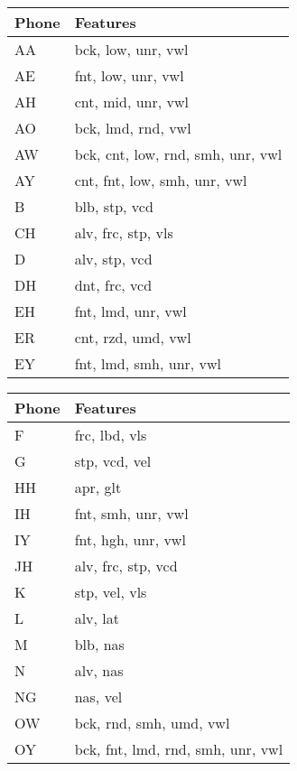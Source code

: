 \begin{table}[!htb]
    \tiny
    \begin{minipage}{.33\linewidth}
        \centering
        \begin{tabular}{ll}
            Phone & Features \\
            \hline
            AA & bck, low, unr, vwl \\
            AE & fnt, low, unr, vwl \\
            AH & cnt, mid, unr, vwl \\
            AO & bck, lmd, rnd, vwl \\
            AW & bck, cnt, low, rnd, smh, unr, vwl \\
            AY & cnt, fnt, low, smh, unr, vwl \\
            B & blb, stp, vcd \\
            CH & alv, frc, stp, vls \\
            D & alv, stp, vcd \\
            DH & dnt, frc, vcd \\
            EH & fnt, lmd, unr, vwl \\
            ER & cnt, rzd, umd, vwl \\
            EY & fnt, lmd, smh, unr, vwl
        \end{tabular}
    \end{minipage}%
    \begin{minipage}{.33\linewidth}
        \centering
        \begin{tabular}{ll}
            Phone & Features \\
            \hline
            F &  frc, lbd, vls \\
            G &  stp, vcd, vel \\
            HH & apr, glt \\
            IH & fnt, smh, unr, vwl \\
            IY & fnt, hgh, unr, vwl \\
            JH & alv, frc, stp, vcd \\
            K &  stp, vel, vls \\
            L &  alv, lat \\
            M &  blb, nas \\
            N &  alv, nas \\
            NG & nas, vel \\
            OW & bck, rnd, smh, umd, vwl \\
            OY & bck, fnt, lmd, rnd, smh, unr, vwl

\end{tabular}
\end{minipage}
\end{table}
